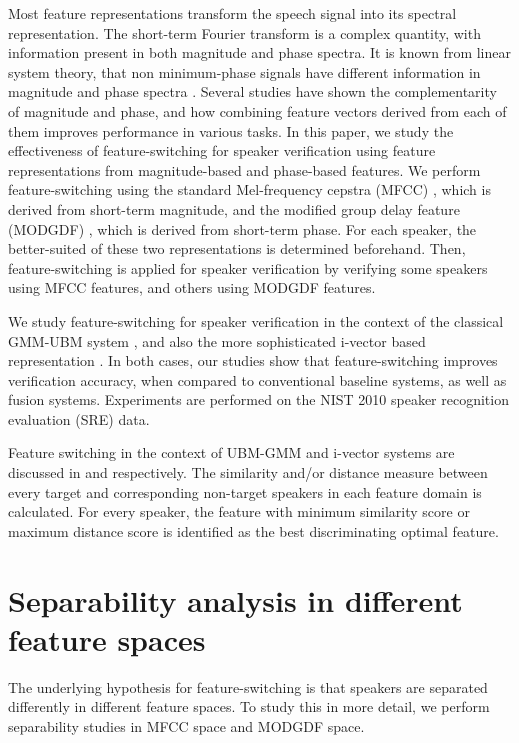 \documentclass{article}
\begin{document}
Most feature representations transform the speech signal into its spectral
representation. The short-term Fourier transform is a complex quantity, with
information present in both magnitude and phase spectra. It is known from linear
system theory, that non minimum-phase signals have different information in
magnitude and phase spectra \cite{oppenheim}. Several studies \cite{mgd_complement}
have shown the complementarity of magnitude and phase, and how combining feature
vectors derived from each of them improves performance in various tasks. In this
paper, we study the effectiveness of feature-switching for speaker verification
using feature representations from magnitude-based and phase-based features. We
perform feature-switching using the standard Mel-frequency cepstra (MFCC)
\cite{mfcc}, which is derived from short-term magnitude, and the modified group delay feature
(MODGDF) \cite{hegdeModgdf}, which is derived from short-term phase. For each speaker, the
better-suited of these two representations is determined beforehand. Then,
feature-switching is applied for speaker verification by verifying some speakers
using MFCC features, and others using MODGDF features.

We study feature-switching for speaker verification in the context of the
classical GMM-UBM system \cite{reynoldsAdaptedGMM}, and also the more
sophisticated i-vector based representation \cite{dehak_ivector}. In both cases,
our studies show that feature-switching improves verification accuracy, when compared to
conventional baseline systems, as well as fusion systems. Experiments are performed on the
NIST 2010 speaker recognition evaluation (SRE) \cite{nist2010SRE} data.

Feature switching in the context of UBM-GMM and i-vector systems are discussed in  \cite{padmanInterspeech2010} and \cite{asha} respectively. The similarity and/or distance measure between every target and corresponding non-target speakers in each feature domain is calculated. For every speaker, the feature with minimum similarity score or maximum distance score is identified as the best discriminating optimal feature. 


\section{Separability analysis in different feature spaces}
\label{sec:separability}
The underlying hypothesis for feature-switching is that speakers are separated
differently in different feature spaces. To study this in more detail, we
perform separability studies in MFCC space and MODGDF space.
\end{document}
